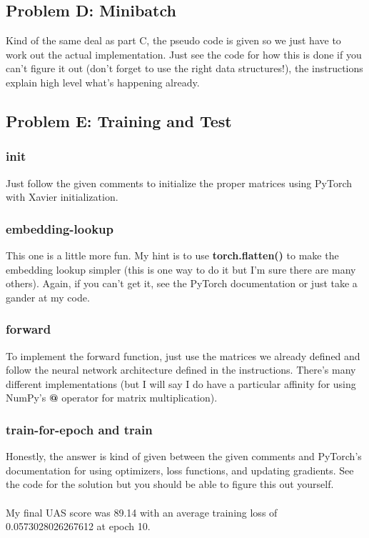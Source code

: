 \documentclass[12pt]{article}
\begin{document}
\subsection{Problem D: Minibatch}
Kind of the same deal as part C, the pseudo code is given so we just have to work out 
the actual implementation. Just see the code for how this is done if you 
can't figure it out (don't forget to use the right data structures!), the instructions 
explain high level what's happening already. 

\subsection{Problem E: Training and Test}
\subsubsection{init}
Just follow the given comments to initialize the proper matrices using
PyTorch with Xavier initialization. 

\subsubsection{embedding-lookup}
This one is a little more fun. My hint is to use \textbf{torch.flatten()} to make the 
embedding lookup simpler (this is one way to do it but I'm sure there are many others). 
Again, if you can't get it, see the PyTorch documentation 
or just take a gander at my code. 

\subsubsection{forward}
To implement the forward function, just use the matrices we already defined and follow
the neural network architecture defined in the instructions. There's many different 
implementations (but I will say I do have a particular affinity for using NumPy's 
\textbf{@} operator for matrix multiplication). 

\subsubsection{train-for-epoch and train}
Honestly, the answer is kind of given between the given comments and PyTorch's 
documentation for using optimizers, loss functions, and updating gradients. 
See the code for the solution but you should be able to figure this out yourself. 
~\\
~\\

\noindent{} My final UAS score was 89.14 with an average training loss of 0.0573028026267612 
at epoch 10. 
\end{document}
